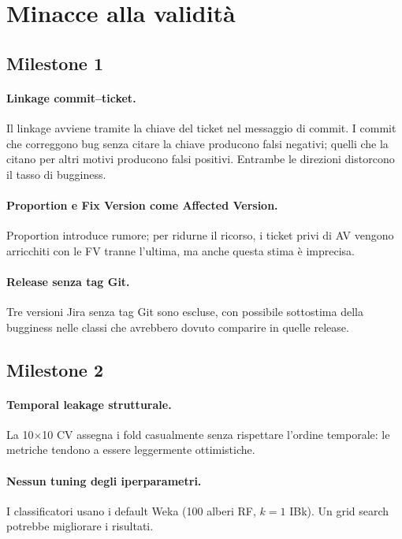 \section{Minacce alla validità}

\subsection{Milestone 1}

\paragraph{Linkage commit--ticket.}
Il linkage avviene tramite la chiave del ticket nel messaggio di commit. I commit che
correggono bug senza citare la chiave producono falsi negativi; quelli che la citano per
altri motivi producono falsi positivi. Entrambe le direzioni distorcono il tasso di bugginess.

\paragraph{Proportion e Fix Version come Affected Version.}
Proportion introduce rumore; per ridurne il ricorso, i ticket privi di AV vengono arricchiti
con le FV tranne l'ultima, ma anche questa stima è imprecisa.

\paragraph{Release senza tag Git.}
Tre versioni Jira senza tag Git sono escluse, con possibile sottostima della bugginess
nelle classi che avrebbero dovuto comparire in quelle release.

\subsection{Milestone 2}

\paragraph{Temporal leakage strutturale.}
La 10$\times$10 CV assegna i fold casualmente senza rispettare l'ordine temporale: le
metriche tendono a essere leggermente ottimistiche.

\paragraph{Nessun tuning degli iperparametri.}
I classificatori usano i default Weka (100 alberi RF, $k=1$ IBk). Un grid search
potrebbe migliorare i risultati.

